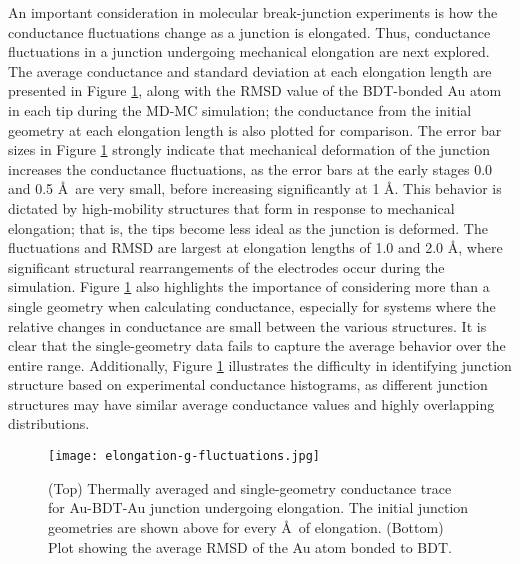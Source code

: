 \documentclass[10pt]{report}  %
\newcommand\findent{\hspace*{\parindent}}
\begin{document}
\findent An important consideration in molecular break-junction experiments is how the conductance fluctuations change as a junction is elongated. Thus, conductance fluctuations in a junction undergoing mechanical elongation are next explored. The average conductance and standard deviation at each elongation length are presented in Figure \ref{fig:elongation-g-fluctuations}, along with the RMSD value of the BDT-bonded Au atom in each tip during the MD-MC simulation; the conductance from the initial geometry at each elongation length is also plotted for comparison. The error bar sizes in Figure \ref{fig:elongation-g-fluctuations} strongly indicate that mechanical deformation of the junction increases the conductance fluctuations, as the error bars at the early stages 0.0 and 0.5 \AA\ are very small, before increasing significantly at 1 \AA. This behavior is dictated by high-mobility structures that form in response to mechanical elongation; that is, the tips become less ideal as the junction is deformed. The fluctuations and RMSD are largest at elongation lengths of 1.0 and 2.0 \AA, where significant structural rearrangements of the electrodes occur during the simulation. Figure \ref{fig:elongation-g-fluctuations} also highlights the importance of considering more than a single geometry when calculating conductance, especially for systems where the relative changes in conductance are small between the various structures. It is clear that the single-geometry data fails to capture the average behavior over the entire range. Additionally, Figure \ref{fig:elongation-g-fluctuations} illustrates the difficulty in identifying junction structure based on experimental conductance histograms, as different junction structures may have similar average conductance values and highly overlapping distributions.

\begin{figure}[t!]
	\centering
	\texttt{[image: elongation-g-fluctuations.jpg]}
	\caption{(Top) Thermally averaged and single-geometry conductance trace for Au-BDT-Au junction undergoing elongation. The initial junction geometries are shown above for every \AA\ of elongation. (Bottom) Plot showing the average RMSD of the Au atom bonded to BDT.  }
	\label{fig:elongation-g-fluctuations}
\end{figure}



%
%
%
%
\end{document}

